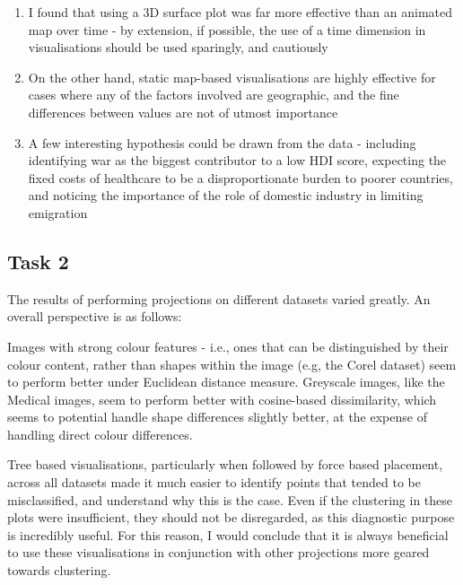 \documentclass[ 10pt ]{fphw}
\begin{document}
\begin{enumerate}
    \item I found that using a 3D surface plot was far more effective than an animated map over time - by extension, if possible, the use of a time dimension in visualisations should be used sparingly, and cautiously
    \item On the other hand, static map-based visualisations are highly effective for cases where any of the factors involved are geographic, and the fine differences between values are not of utmost importance
    \item A few interesting hypothesis could be drawn from the data - including identifying war as the biggest contributor to a low HDI score, expecting the fixed costs of healthcare to be a disproportionate burden to poorer countries, and noticing the importance of the role of domestic industry in limiting emigration
\end{enumerate}

\subsection*{Task 2}

The results of performing projections on different datasets varied greatly. An overall perspective is as follows:

Images with strong colour features - i.e., ones that can be distinguished by their colour content, rather than shapes within the image (e.g, the Corel dataset) seem to perform better under Euclidean distance measure. Greyscale images, like the Medical images, seem to perform better with cosine-based dissimilarity, which seems to potential handle shape differences slightly better, at the expense of handling direct colour differences.

Tree based visualisations, particularly when followed by force based placement, across all datasets made it much easier to identify points that tended to be misclassified, and understand why this is the case. Even if the clustering in these plots were insufficient, they should not be disregarded, as this diagnostic purpose is incredibly useful. For this reason, I would conclude that it is always beneficial to use these visualisations in conjunction with other projections more geared towards clustering. 
\end{document}
